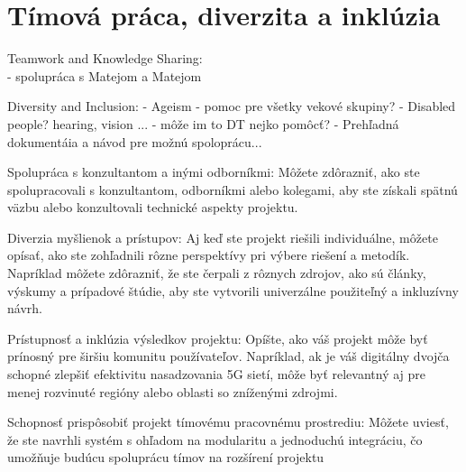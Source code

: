 \section{Tímová práca, diverzita a inklúzia}
\par{
Teamwork and Knowledge Sharing: \\
- spolupráca s Matejom a Matejom

Diversity and Inclusion:
- Ageism - pomoc pre všetky vekové skupiny?
- Disabled people? hearing, vision ...
- môže im to DT nejko pomôcť?
- Prehľadná dokumentáia a návod pre možnú spoloprácu...
}

Spolupráca s konzultantom a inými odborníkmi: Môžete zdôrazniť, ako ste spolupracovali s konzultantom, odborníkmi alebo kolegami, aby ste získali spätnú väzbu alebo konzultovali technické aspekty projektu.

Diverzia myšlienok a prístupov: Aj keď ste projekt riešili individuálne, môžete opísať, ako ste zohľadnili rôzne perspektívy pri výbere riešení a metodík. Napríklad môžete zdôrazniť, že ste čerpali z rôznych zdrojov, ako sú články, výskumy a prípadové štúdie, aby ste vytvorili univerzálne použiteľný a inkluzívny návrh.

Prístupnosť a inklúzia výsledkov projektu: Opíšte, ako váš projekt môže byť prínosný pre širšiu komunitu používateľov. Napríklad, ak je váš digitálny dvojča schopné zlepšiť efektivitu nasadzovania 5G sietí, môže byť relevantný aj pre menej rozvinuté regióny alebo oblasti so zníženými zdrojmi.

Schopnosť prispôsobiť projekt tímovému pracovnému prostrediu: Môžete uviesť, že ste navrhli systém s ohľadom na modularitu a jednoduchú integráciu, čo umožňuje budúcu spoluprácu tímov na rozšírení projektu
